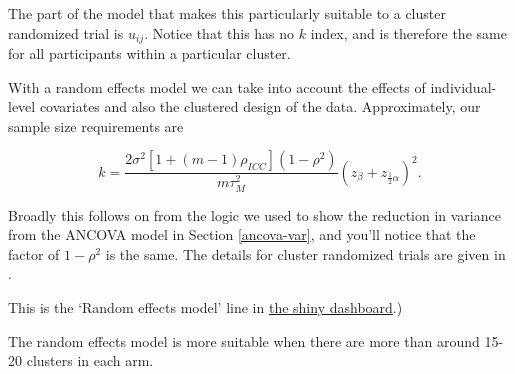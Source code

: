 \documentclass[
  openany]{book}
\theoremstyle{definition}
\theoremstyle{definition}
\theoremstyle{definition}
\theoremstyle{definition}
\theoremstyle{remark}
\begin{document}
The part of the model that makes this particularly suitable to a cluster randomized trial is \(u_{ij}\). Notice that this has no \(k\) index, and is therefore the same for all participants within a particular cluster.

With a random effects model we can take into account the effects of individual-level covariates and also the clustered design of the data. Approximately, our sample size requirements are

\[
k = \frac{2 \sigma^2 \left[1+ \left(m-1\right)\rho_{ICC}\right]\left(1-\rho^2\right) }{m\tau^2_M}\left(z_{\beta} + z_{\frac{1}{2}\alpha}\right)^2.
\]

Broadly this follows on from the logic we used to show the reduction in variance from the ANCOVA model in Section \ref{ancova-var}, and you'll notice that the factor of \(1-\rho^2\) is the same. The details for cluster randomized trials are given in \citet{teerenstra2012simple}.

This is the `Random effects model' line in \href{https://racheloughton.shinyapps.io/sample_size/?_ga=2.190583720.2013007057.1679308387-1261352122.1678702192}{the shiny dashboard}.)

The random effects model is more suitable when there are more than around 15-20 clusters in each arm.
\end{document}
